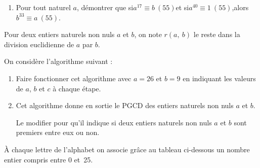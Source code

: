 \begin{colonne*exercice}
\begin{exercice}
\begin{enumerate}
\begin{enumerate}
\item Résoudre l'équation $\left(E'\right)$.
	
En déduire qu'il existe un unique naturel $x_{0}<40$ tel que : $17x_{0}\equiv 1~(40)$.\medskip
	\end{enumerate}
	
\item Pour tout naturel $a$, démontrer que si\enskip $a^{17} \equiv b~(55)$\enskip et si\enskip $a^{40} \equiv 1~(55)$,\enskip alors\enskip $b^{33} \equiv a~(55)$.
\end{enumerate}
\end{exercice}


\begin{exercice}

\partie{}

Pour deux entiers naturels non nuls $a$ et $b$, on note $r(a,~b)$ le reste dans la division euclidienne de $a$ par $b$.

On considère l'algorithme suivant :

\begin{center}
\begin{algorithme}
\BlocVariables
{}
\BlocEntrees
{}
\BlocTraitements
{}
\BlocAffichage
{}
\end{algorithme}
\end{center}

\begin{enumerate}
\item Faire fonctionner cet algorithme avec $a = 26$ et $b = 9$ en indiquant les valeurs de $a$, $b$ et $c$ à chaque étape.
\item Cet algorithme donne en sortie le PGCD des entiers naturels non nuls $a$ et $b$.

Le modifier pour qu'il indique si deux entiers naturels non nuls $a$ et $b$ sont premiers entre eux ou non.
\end{enumerate}

\partie{}

À chaque lettre de l'alphabet on associe grâce au tableau ci-dessous un nombre entier compris entre 0 et~25.


\end{exercice}
\end{colonne*exercice}
